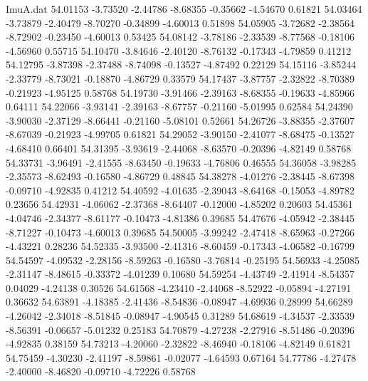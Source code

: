 \begin{filecontents}{ImuA.dat}
  54.01153   -3.73520   -2.44786   -8.68355   -0.35662   -4.54670    0.61821
  54.03464   -3.73879   -2.40479   -8.70270   -0.34899   -4.60013    0.51898
  54.05905   -3.72682   -2.38564   -8.72902   -0.23450   -4.60013    0.53425
  54.08142   -3.78186   -2.33539   -8.77568   -0.18106   -4.56960    0.55715
  54.10470   -3.84646   -2.40120   -8.76132   -0.17343   -4.79859    0.41212
  54.12795   -3.87398   -2.37488   -8.74098   -0.13527   -4.87492    0.22129
  54.15116   -3.85244   -2.33779   -8.73021   -0.18870   -4.86729    0.33579
  54.17437   -3.87757   -2.32822   -8.70389   -0.21923   -4.95125    0.58768
  54.19730   -3.91466   -2.39163   -8.68355   -0.19633   -4.85966    0.64111
  54.22066   -3.93141   -2.39163   -8.67757   -0.21160   -5.01995    0.62584
  54.24390   -3.90030   -2.37129   -8.66441   -0.21160   -5.08101    0.52661
  54.26726   -3.88355   -2.37607   -8.67039   -0.21923   -4.99705    0.61821
  54.29052   -3.90150   -2.41077   -8.68475   -0.13527   -4.68410    0.66401
  54.31395   -3.93619   -2.44068   -8.63570   -0.20396   -4.82149    0.58768
  54.33731   -3.96491   -2.41555   -8.63450   -0.19633   -4.76806    0.46555
  54.36058   -3.98285   -2.35573   -8.62493   -0.16580   -4.86729    0.48845
  54.38278   -4.01276   -2.38445   -8.67398   -0.09710   -4.92835    0.41212
  54.40592   -4.01635   -2.39043   -8.64168   -0.15053   -4.89782    0.23656
  54.42931   -4.06062   -2.37368   -8.64407   -0.12000   -4.85202    0.20603
  54.45361   -4.04746   -2.34377   -8.61177   -0.10473   -4.81386    0.39685
  54.47676   -4.05942   -2.38445   -8.71227   -0.10473   -4.60013    0.39685
  54.50005   -3.99242   -2.47418   -8.65963   -0.27266   -4.43221    0.28236
  54.52335   -3.93500   -2.41316   -8.60459   -0.17343   -4.06582   -0.16799
  54.54597   -4.09532   -2.28156   -8.59263   -0.16580   -3.76814   -0.25195
  54.56933   -4.25085   -2.31147   -8.48615   -0.33372   -4.01239    0.10680
  54.59254   -4.43749   -2.41914   -8.54357    0.04029   -4.24138    0.30526
  54.61568   -4.23410   -2.44068   -8.52922   -0.05894   -4.27191    0.36632
  54.63891   -4.18385   -2.41436   -8.54836   -0.08947   -4.69936    0.28999
  54.66289   -4.26042   -2.34018   -8.51845   -0.08947   -4.90545    0.31289
  54.68619   -4.34537   -2.33539   -8.56391   -0.06657   -5.01232    0.25183
  54.70879   -4.27238   -2.27916   -8.51486   -0.20396   -4.92835    0.38159
  54.73213   -4.20060   -2.32822   -8.46940   -0.18106   -4.82149    0.61821
  54.75459   -4.30230   -2.41197   -8.59861   -0.02077   -4.64593    0.67164
  54.77786   -4.27478   -2.40000   -8.46820   -0.09710   -4.72226    0.58768

\end{filecontents}

